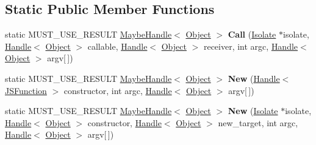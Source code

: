 \subsection*{Static Public Member Functions}
\begin{DoxyCompactItemize}
\item 
static M\+U\+S\+T\+\_\+\+U\+S\+E\+\_\+\+R\+E\+S\+U\+LT \hyperlink{classv8_1_1internal_1_1_maybe_handle}{Maybe\+Handle}$<$ \hyperlink{classv8_1_1internal_1_1_object}{Object} $>$ {\bfseries Call} (\hyperlink{classv8_1_1internal_1_1_isolate}{Isolate} $\ast$isolate, \hyperlink{classv8_1_1internal_1_1_handle}{Handle}$<$ \hyperlink{classv8_1_1internal_1_1_object}{Object} $>$ callable, \hyperlink{classv8_1_1internal_1_1_handle}{Handle}$<$ \hyperlink{classv8_1_1internal_1_1_object}{Object} $>$ receiver, int argc, \hyperlink{classv8_1_1internal_1_1_handle}{Handle}$<$ \hyperlink{classv8_1_1internal_1_1_object}{Object} $>$ argv\mbox{[}$\,$\mbox{]})\hypertarget{classv8_1_1internal_1_1_execution_ab0d46a6f39b3b195d49ffb2c4bfd89c8}{}\label{classv8_1_1internal_1_1_execution_ab0d46a6f39b3b195d49ffb2c4bfd89c8}

\item 
static M\+U\+S\+T\+\_\+\+U\+S\+E\+\_\+\+R\+E\+S\+U\+LT \hyperlink{classv8_1_1internal_1_1_maybe_handle}{Maybe\+Handle}$<$ \hyperlink{classv8_1_1internal_1_1_object}{Object} $>$ {\bfseries New} (\hyperlink{classv8_1_1internal_1_1_handle}{Handle}$<$ \hyperlink{classv8_1_1internal_1_1_j_s_function}{J\+S\+Function} $>$ constructor, int argc, \hyperlink{classv8_1_1internal_1_1_handle}{Handle}$<$ \hyperlink{classv8_1_1internal_1_1_object}{Object} $>$ argv\mbox{[}$\,$\mbox{]})\hypertarget{classv8_1_1internal_1_1_execution_a2051f0ffec15f60e91290f33e6c53865}{}\label{classv8_1_1internal_1_1_execution_a2051f0ffec15f60e91290f33e6c53865}

\item 
static M\+U\+S\+T\+\_\+\+U\+S\+E\+\_\+\+R\+E\+S\+U\+LT \hyperlink{classv8_1_1internal_1_1_maybe_handle}{Maybe\+Handle}$<$ \hyperlink{classv8_1_1internal_1_1_object}{Object} $>$ {\bfseries New} (\hyperlink{classv8_1_1internal_1_1_isolate}{Isolate} $\ast$isolate, \hyperlink{classv8_1_1internal_1_1_handle}{Handle}$<$ \hyperlink{classv8_1_1internal_1_1_object}{Object} $>$ constructor, \hyperlink{classv8_1_1internal_1_1_handle}{Handle}$<$ \hyperlink{classv8_1_1internal_1_1_object}{Object} $>$ new\+\_\+target, int argc, \hyperlink{classv8_1_1internal_1_1_handle}{Handle}$<$ \hyperlink{classv8_1_1internal_1_1_object}{Object} $>$ argv\mbox{[}$\,$\mbox{]})\hypertarget{classv8_1_1internal_1_1_execution_aa03806bab8b5ac5c579fa7c27cf9d823}{}\label{classv8_1_1internal_1_1_execution_aa03806bab8b5ac5c579fa7c27cf9d823}


\end{DoxyCompactItemize}
